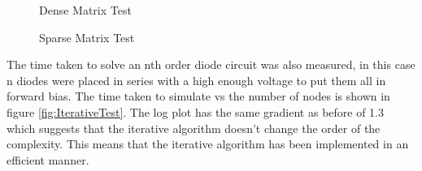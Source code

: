 \documentclass{article}
\begin{document}
\begin{figure}[h]%
    \centering
    \qquad
    \caption{Dense Matrix Test}%
    \label{fig:DenseTest}%
\end{figure}
\begin{figure}[h]%
    \centering
    \qquad
    \caption{Sparse Matrix Test}%
    \label{fig:SparseTest}%
\end{figure}
The time taken to solve an nth order diode circuit was also measured, in this case n diodes were placed in series with a high enough voltage to put them all in forward bias. The time taken to simulate vs the number of nodes is shown in figure \ref{fig:IterativeTest}. The log plot has the same gradient as before of 1.3 which suggests that the iterative algorithm doesn't change the order of the complexity. This means that the iterative algorithm has been implemented in an efficient manner.
\end{document}
